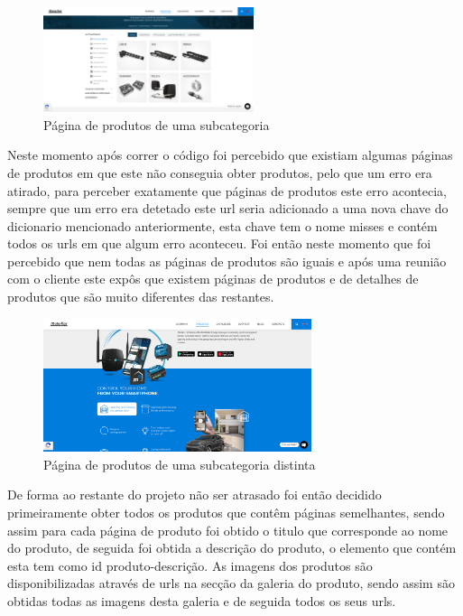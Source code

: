 \begin{figure}[htb]
    \centering
    
    \includegraphics[width=0.55\textwidth]{images/implementacao/scraper/pagina_produtos_subcat.png}
    \caption{Página de produtos de uma subcategoria}
    \label{fig:51}
\end{figure}

\newpage
Neste momento após correr o código foi percebido que existiam algumas páginas de produtos em que este não conseguia obter produtos,
pelo que um erro era atirado, para perceber exatamente que páginas de produtos este erro acontecia, sempre que um erro era detetado
este url seria adicionado a uma nova chave do dicionario mencionado anteriormente, esta chave tem o nome misses e contém todos os urls
em que algum erro aconteceu. Foi então neste momento que foi percebido que nem todas as páginas de produtos são iguais e após uma
reunião com o cliente este expôs que existem páginas de produtos e de detalhes de produtos que são muito diferentes das restantes.

\begin{figure}[htb]
    \centering
    
    \includegraphics[width=0.7\textwidth]{images/implementacao/scraper/mconnect.png}
    \caption{Página de produtos de uma subcategoria distinta}
    \label{fig:52}
\end{figure}

De forma ao restante do projeto não ser atrasado foi então decidido primeiramente obter todos os produtos que contêm páginas semelhantes,
sendo assim para cada página de produto foi obtido o titulo que corresponde ao nome do produto, de seguida foi obtida a descrição do produto,
o elemento que contém esta tem como id produto-descrição. As imagens dos produtos são disponibilizadas através de urls na secção da galeria do produto, sendo assim são obtidas todas as imagens desta
galeria e de seguida todos os seus urls.

